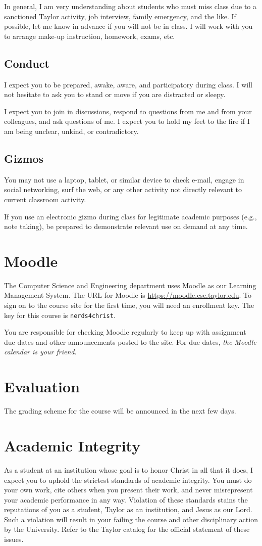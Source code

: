 \documentclass{article}
\begin{document}
In general, I am very understanding about students who must miss class
due to a sanctioned Taylor activity, job interview, family emergency, and the like.
If possible, let me know in advance if you will not be in class.
I will work with you to arrange make-up instruction, homework, exams, etc.
\subsection{Conduct}
\label{sec:orgheadline11}
I expect you to be prepared, awake, aware, and participatory during class.
I will not hesitate to ask you to stand or move if you are distracted or sleepy.

I expect you to join in discussions,
respond to questions from me and from your colleagues,
and ask questions of me.
I expect you to hold my feet to the fire
if I am being unclear, unkind, or contradictory.
\subsection{Gizmos}
\label{sec:orgheadline12}
You may not use a laptop, tablet, or similar device
to check e-mail, engage in social networking, surf the web,
or any other activity not directly relevant to current classroom activity.

If you use an electronic gizmo during class
for legitimate academic purposes (e.g., note taking),
be prepared to demonstrate relevant use on demand at any time.
\section{Moodle}
\label{sec:orgheadline14}
The Computer Science and Engineering department uses Moodle as our Learning Management
System. The URL for Moodle is \url{https://moodle.cse.taylor.edu}. To sign on to the course site
for the first time, you will need an enrollment key. The key for this course is
\texttt{nerds4christ}.

You are responsible for checking Moodle regularly to keep up with assignment due dates and
other announcements posted to the site. For due dates, \emph{the Moodle calendar is your friend}.
\section{Evaluation}
\label{sec:orgheadline15}
The grading scheme for the course will be announced in the next few days.

\section{Academic Integrity}
\label{sec:orgheadline16}
As a student at an institution whose goal is to honor Christ in all that it does,
I expect you to uphold the strictest standards of academic integrity.
You must do your own work,
cite others when you present their work,
and never misrepresent your academic performance in any way.
Violation of these standards stains the reputations
of you as a student,
Taylor as an institution,
and Jesus as our Lord.
Such a violation will result in your failing the course
and other disciplinary action by the University.
Refer to the Taylor catalog for the official statement of these issues.
\end{document}

